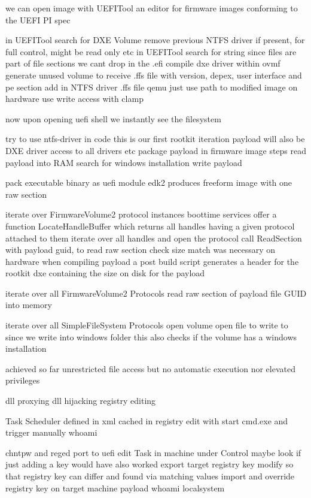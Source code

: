 we can open image with UEFITool
an editor for firmware images conforming to the UEFI PI spec \cite{uefitool}

in UEFITool search for DXE Volume
remove previous NTFS driver if present, for full control, might be read only etc
in UEFITool search for string
since files are part of file sections we cant drop in the .efi
compile dxe driver within ovmf
generate unused volume to receive .ffs file with version, depex, user interface and pe section
add in NTFS driver .ffs file
qemu just use path to modified image
on hardware use write access with clamp

now upon opening uefi shell
we instantly see the filesystem

try to use ntfs-driver in code
this is our first rootkit iteration
payload will also be DXE driver
access to all drivers etc
package payload in firmware image
steps
read payload into RAM
search for windows installation
write payload

pack executable binary as uefi module
edk2 produces freeform image with one raw section

iterate over FirmwareVolume2 protocol instances
boottime services offer a function LocateHandleBuffer which returns all handles having a given protocol attached to them
iterate over all handles and open the protocol
call ReadSection with payload guid, to read raw section
check size match was necessary on hardware
when compiling payload a post build script generates a header for the rootkit dxe containing the size on disk for the payload

iterate over all FirmwareVolume2 Protocols
read raw section of payload file GUID into memory

iterate over all SimpleFileSystem Protocols
open volume
open file to write to
since we write into windows folder this also checks if the volume has a windows installation

achieved so far unrestricted file access
but no automatic execution nor elevated privileges

dll proxying
dll hijacking
registry editing

Task Scheduler
defined in xml
cached in registry
edit with start cmd.exe and trigger manually
whoami

chntpw and reged
\cite{chntpw}
port to uefi
edit Task in machine under Control
maybe look if just adding a key would have also worked
export target registry key
modify so that registry key can differ and found via matching values
import and override registry key on target machine
payload whoami
localsystem

